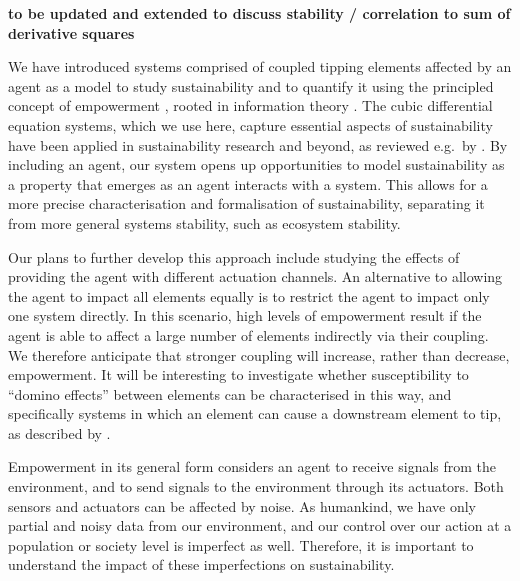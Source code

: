 \documentclass[conference]{IEEEtran}
\begin{document}
\textbf{to be updated and extended to discuss stability / correlation
  to sum of derivative squares}


We have introduced systems comprised of coupled tipping elements
affected by an agent as a model to study sustainability and to
quantify it using the principled concept of empowerment
\cite{Salge2014_empowermentintro}, rooted in information theory
\cite{CoverThomas1991_informationtheory}. The cubic differential
equation systems, which we use here, capture essential aspects of
sustainability have been applied in sustainability research and
beyond, as reviewed e.g.\ by
\cite{Klose2019_interactingtippingelements}. By including an agent,
our system opens up opportunities to model sustainability as a
property that emerges as an agent interacts with a system. This allows
for a more precise characterisation and formalisation of
sustainability, separating it from more general systems stability,
such as ecosystem stability.

Our plans to further develop this approach include studying the
effects of providing the agent with different actuation channels. An
alternative to allowing the agent to impact all elements equally is to
restrict the agent to impact only one system directly. In this
scenario, high levels of empowerment result if the agent is able to
affect a large number of elements indirectly via their coupling. We
therefore anticipate that stronger coupling will increase, rather than
decrease, empowerment. It will be interesting to investigate whether
susceptibility to ``domino effects'' between elements can be
characterised in this way, and specifically systems in which an
element can cause a downstream element to tip, as described by
\cite{Brummitt2015_coupledcatastrophes}.

Empowerment in its general form considers an agent to receive signals
from the environment, and to send signals to the environment through
its actuators. Both sensors and actuators can be affected by noise. As
humankind, we have only partial and noisy data from our environment,
and our control over our action at a population or society level is
imperfect as well. Therefore, it is important to understand the impact
of these imperfections on sustainability.


\end{document}
